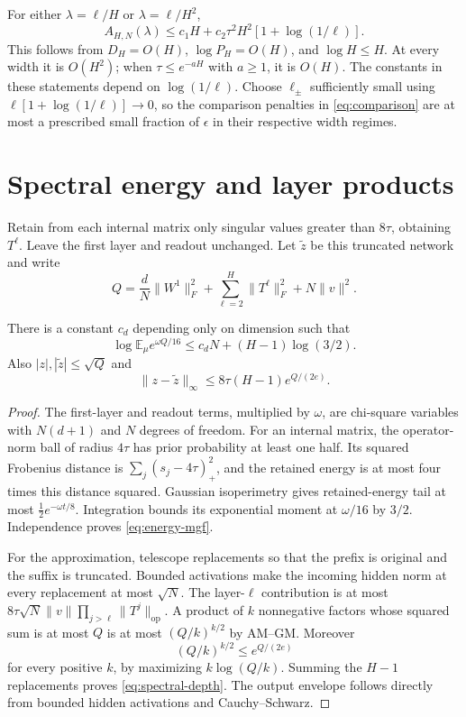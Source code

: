 \documentclass[11pt]{article}
\newcommand{\E}{\mathbb E}\newcommand{\R}{\mathbb R}\newcommand{\KL}{\operatorname{KL}}\newcommand{\op}{\mathrm{op}}
\begin{document}
For either $\lambda=\ell/H$ or $\lambda=\ell/H^2$,
\begin{equation}
 A_{H,N}(\lambda)\le c_1H+
      c_2\tau^2H^2[1+\log(1/\ell)].
 \label{eq:teacher-depth}
\end{equation}
This follows from $D_H=O(H)$, $\log P_H=O(H)$, and $\log H\le H$. At every width it is $O(H^2)$; when $\tau\le e^{-aH}$ with $a\ge1$, it is $O(H)$. The constants in these statements depend on $\log(1/\ell)$. Choose $\ell_\pm$ sufficiently small using $\ell[1+\log(1/\ell)]\to0$, so the comparison penalties in \eqref{eq:comparison} are at most a prescribed small fraction of $\epsilon$ in their respective width regimes.

\section{Spectral energy and layer products}
Retain from each internal matrix only singular values greater than $8\tau$, obtaining $T^\ell$. Leave the first layer and readout unchanged. Let $\widetilde z$ be this truncated network and write
\[
 Q=\frac dN\|W^1\|_F^2+
       \sum_{\ell=2}^H\|T^\ell\|_F^2+N\|v\|^2.
\]

\begin{lemma}
\label{lem:spectral}
There is a constant $c_d$ depending only on dimension such that
\begin{equation}
 \log\E_\mu e^{\omega Q/16}\le c_dN+(H-1)\log(3/2).
 \label{eq:energy-mgf}
\end{equation}
Also $|z|,|\widetilde z|\le\sqrt Q$ and
\begin{equation}
 \|z-\widetilde z\|_\infty
 \le8\tau(H-1)e^{Q/(2e)}.
 \label{eq:spectral-depth}
\end{equation}
\end{lemma}
\begin{proof}
The first-layer and readout terms, multiplied by $\omega$, are chi-square variables with $N(d+1)$ and $N$ degrees of freedom. For an internal matrix, the operator-norm ball of radius $4\tau$ has prior probability at least one half. Its squared Frobenius distance is $\sum_j(s_j-4\tau)_+^2$, and the retained energy is at most four times this distance squared. Gaussian isoperimetry gives retained-energy tail at most $\tfrac12e^{-\omega t/8}$. Integration bounds its exponential moment at $\omega/16$ by $3/2$. Independence proves \eqref{eq:energy-mgf}.

For the approximation, telescope replacements so that the prefix is original and the suffix is truncated. Bounded activations make the incoming hidden norm at every replacement at most $\sqrt N$. The layer-$\ell$ contribution is at most
$8\tau\sqrt N\|v\|\prod_{j>\ell}\|T^j\|_\op$.
A product of $k$ nonnegative factors whose squared sum is at most $Q$ is at most $(Q/k)^{k/2}$ by AM--GM. Moreover
\[
 (Q/k)^{k/2}\le e^{Q/(2e)}
\]
for every positive $k$, by maximizing $k\log(Q/k)$. Summing the $H-1$ replacements proves \eqref{eq:spectral-depth}. The output envelope follows directly from bounded hidden activations and Cauchy--Schwarz.
\end{proof}
\end{document}
